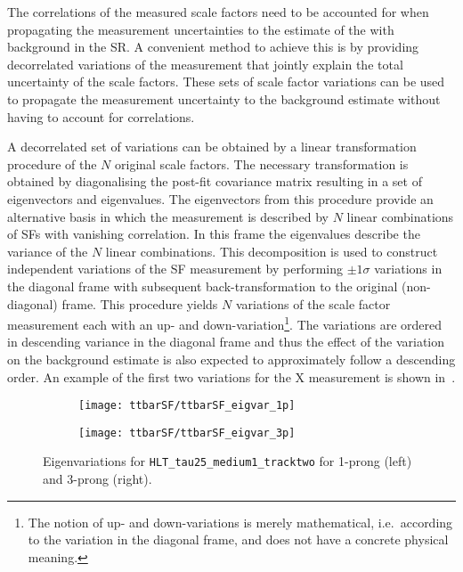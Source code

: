 The correlations of the measured scale factors need to be accounted
for when propagating the measurement uncertainties to the estimate of
the \ttbar with \faketauhadvis background in the \hadhad SR. A
convenient method to achieve this is by providing decorrelated
variations of the measurement that jointly explain the total
uncertainty of the scale factors. These sets of scale factor
variations can be used to propagate the measurement uncertainty to the
background estimate without having to account for correlations.

A decorrelated set of variations can be obtained by a linear
transformation procedure of the $N$ original scale factors. The
necessary transformation is obtained by diagonalising the post-fit
covariance matrix resulting in a set of eigenvectors and
eigenvalues. The eigenvectors from this procedure provide an
alternative basis in which the measurement is described by $N$ linear
combinations of SFs with vanishing correlation. In this frame the
eigenvalues describe the variance of the $N$ linear combinations. This
decomposition is used to construct independent variations of the SF
measurement by performing $\pm 1 \sigma$ variations in the diagonal
frame with subsequent back-transformation to the original
(non-diagonal) frame. This procedure yields $N$ variations of the
scale factor measurement each with an up- and
down-variation\footnote{The notion of up- and down-variations is
  merely mathematical, i.e.\ according to the variation in the
  diagonal frame, and does not have a concrete physical meaning.}. The
variations are ordered in descending variance in the diagonal frame
and thus the effect of the variation on the background estimate is
also expected to approximately follow a descending order. An example
of the first two variations for the X measurement is shown
in~.

\begin{figure}[htbp]
  \centering

  \begin{subfigure}[t]{.495\textwidth}
    \texttt{[image: ttbarSF/ttbarSF\_eigvar\_1p]}
  \end{subfigure}\hfill%
  \begin{subfigure}[t]{.495\textwidth}
    \texttt{[image: ttbarSF/ttbarSF\_eigvar\_3p]}
  \end{subfigure}

  \caption{Eigenvariations for \texttt{HLT\_tau25\_medium1\_tracktwo}
    for 1-prong (left) and 3-prong \tauhadvis (right).}
  \label{fig:ttbarSF_eigenvariations}
\end{figure}

